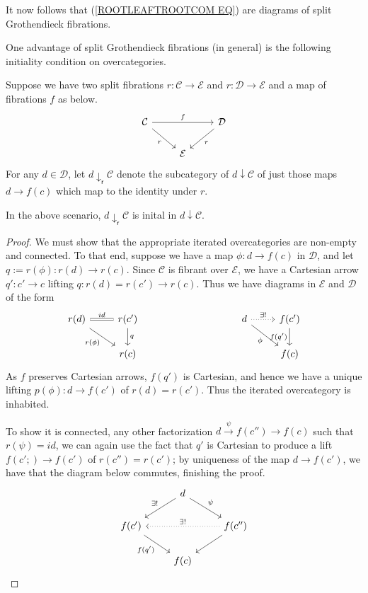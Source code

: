 \documentclass[a4paper,10pt]{article}%
\begin{document}
It now follows that (\ref{ROOTLEAFTROOTCOM EQ}) are diagrams of split Grothendieck fibrations.

One advantage of split Grothendieck fibrations (in general) is the following initiality condition on overcategories.
\begin{definition}
  Suppose we have two split fibrations $r: \mathcal C \to \mathcal E$ and $r: \mathcal D \to \mathcal E$ and a map of fibrations $f$ as below.
  \[
  \begin{tikzcd}
    \mathcal C \arrow[dr, "r"'] \arrow[rr, "f"] & & \mathcal D \arrow[dl, "r"]\\
    &     \mathcal E
  \end{tikzcd}
  \]  
  For any $d\in \mathcal D$, let $d \downarrow_{\mathsf r}\mathcal C$ denote the subcategory of $d\downarrow \mathcal C$ of just those maps $d \to f(c)$ which map to the identity under $r$.
\end{definition}
\begin{lemma}
  In the above scenario, $d \downarrow_{\mathsf r}\mathcal C$ is inital in $d\downarrow \mathcal C$.
\end{lemma}
\begin{proof}
  We must show that the appropriate iterated overcategories are non-empty and connected. To that end, suppose we have a map $\phi: d\to f(c)$ in $\mathcal D$, and let $q := r(\phi): r(d) \to r(c)$. Since $\mathcal C$ is fibrant over $\mathcal E$, we have a Cartesian arrow $q': c' \to c$ lifting $q: r(d) = r(c') \to r(c)$. Thus we have diagrams in $\mathcal E$ and $\mathcal D$ of the form
\[
\begin{tikzcd}
  r(d) \arrow[dr, "r(\phi)"'] \arrow[r, equal, "id"] & r(c') \arrow[d, "q"] &\qquad \qquad & d \arrow[dr, "\phi"'] \arrow[r, dotted, "\exists!"] & f(c') \arrow[d, "f(q')"'] \\
  & r(c) & & & f(c)
\end{tikzcd}
\]
As $f$ preserves Cartesian arrows, $f(q')$ is Cartesian, and hence we have a unique lifting $p(\phi): d \to f(c')$ of $r(d) = r(c')$. Thus the iterated overcategory is inhabited.

To show it is connected, any other factorization $d \xrightarrow{\psi} f(c'') \to f(c)$ such that $r(\psi) = id$, we can again use the fact that $q'$ is Cartesian to produce a lift $f(c';) \to f(c')$ of $r(c'') = r(c')$; by uniqueness of the map $d \to f(c')$, we have that the diagram below commutes, finishing the proof.
\[
\begin{tikzcd}
  & d \arrow[dl, "\exists!"'] \arrow[dr, "\psi"] & \\
  f(c') \arrow[dr, "f(q')"']  && f(c'') \arrow[ll, dotted, "\exists!"'] \arrow[dl]\\
  & f(c)
\end{tikzcd}
\]
\end{proof}
\end{document}

